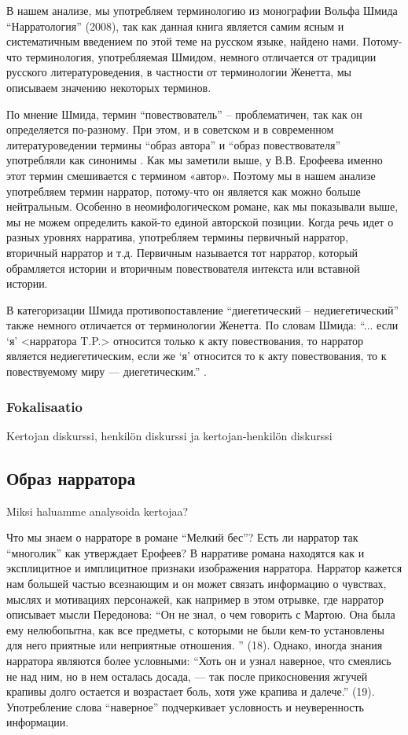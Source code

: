 \documentclass[12pt,a4paper]{article}
\begin{document}
В нашем анализе, мы употребляем терминологию из монографии Вольфа Шмида \enquote{Нарратология} (2008), так как данная книга является самим ясным и систематичным введением по этой теме на русском языке, найдено нами. Потому-что терминология, употребляемая Шмидом, немного отличается от традиции русского литературоведения, в частности от терминологии Женетта, мы описываем значению некоторых терминов.
  
По мнение Шмида, термин \enquote{повествователь} -- проблематичен, так как он
определяется по-разному. При этом, и в советском и в современном
литературоведении термины \enquote{образ автора} и \enquote{образ повествователя} употребляли как
синонимы \parencite[67--68]{schmid2008}.  Как мы заметили выше, у В.В.
Ерофеева именно этот термин смешивается с термином «автор». Поэтому мы в нашем анализе
употребляем термин нарратор, потому-что он является как можно больше
нейтральным. Особенно в неомифологическом романе, как мы показывали выше, мы не можем определить какой-то единой авторской позиции.  Когда речь идет о разных уровнях нарратива, употребляем термины
первичный нарратор, вторичный нарратор и т.д. Первичным называется тот нарратор,
который  обрамляется истории и вторичным повествователя интекста или вставной истории.

В категоризации Шмида противопоставление \enquote{диегетический -- недиегетический} также немного отличается от терминологии Женетта. По словам Шмида: \enquote{... если \enquote{я} <нарратора T.P.> относится только к акту повествования, то нарратор является недиегетическим, если же \enquote{я} относится то к акту повествования, то к повествуемому миру — диегетическим.} \parencite[84]{schmid2008}.

\subsubsection{Fokalisaatio}
Kertojan diskurssi, henkilön diskurssi ja kertojan-henkilön diskurssi

\subsection{Образ нарратора}

Miksi haluamme analysoida kertojaa? 

Что мы знаем о нарраторе в романе \enquote{Мелкий бес}?
Есть ли нарратор так \enquote{многолик} как утверждает Ерофеев? В нарративе романа находятся как и эксплицитное и имплицитное признаки изображения нарратора. Нарратор кажется нам большей частью всезнающим и он может связать информацию о чувствах, мыслях и мотивациях персонажей, как например в этом отрывке, где нарратор описывает мысли Передонова:  \enquote{Он не знал, о чем говорить с Мартою. Она была ему нелюбопытна,
как все предметы, с которыми не были кем-то установлены для него
приятные или неприятные отношения.
} (18). Однако, иногда знания нарратора являются более условными: \enquote{Хоть он и узнал наверное, что смеялись не над ним, но в нем осталась досада, — так после прикосновения жгучей крапивы долго остается и  возрастает боль, хотя уже крапива и далече.} (19). Употребление слова \enquote{наверное} подчеркивает условность и неуверенность информации. 
\end{document}
